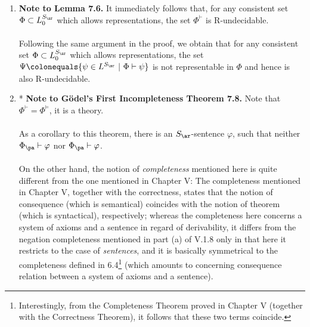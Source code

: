 \begin{enumerate}[1.]
\[\begin{cases}
\end{cases}
\]
This way we would obtain the same result.\\
\ \\
\textit{Remark.} The choice of $\beta (x)$ mentioned earlier somehow reminds me of Russel's paradox: For the set $S \colonequals \{ \mbox{\begin{math}x\end{math} is a set} \ | \ x \not\in x \}$, we have for all sets $x$,
\begin{center}
$x \in S$ \ \ \ iff \ \ \ $x \not\in x$.
\end{center}
In particular, for $x = S$,
\begin{center}
$S \in S$ \ \ \ iff \ \ \ $S \not\in S$.
\end{center}
[IMCOPLETE: Consider the relation between 7.5 and halting problem.]
%
\item \textbf{Note to Lemma 7.6.} It immediately follows that, for any consistent set $\Phi \subset L_0^{S_\ar}$ which allows representations, the set $\Phi^\vdash$ is R-undecidable.\\
\ \\
Following the same argument in the proof, we obtain that for any consistent set $\Phi \subset L_0^{S_\ar}$ which allows representations, the set $\Psi \colonequals \{ \psi \in L^{S_\ar} \ | \ \Phi \vdash \psi \}$ is not representable in $\Phi$ and hence is also R-undecidable.
%
\item* \textbf{Note to G\"{o}del's First Incompleteness Theorem 7.8.} Note that $\Phi^\vdash = \Phi^{\models}$, it is a theory.\\
\ \\
As a corollary to this theorem, there is an $S_\ar$-sentence $\varphi$, such that neither $\Phi_\pa \vdash \varphi$ nor $\Phi_\pa \vdash \varphi$.\\
\ \\
On the other hand, the notion of \emph{completeness} mentioned here is quite different from the one mentioned in Chapter V: The completeness mentioned in Chapter V, together with the correctness, states that the notion of consequence (which is semantical) coincides with the notion of theorem (which is syntactical), respectively; whereas the completeness here concerns a system of axioms and a sentence in regard of derivability, it differs from the negation completeness mentioned in part (a) of V.1.8 only in that here it restricts to the case of \emph{sentences}, and it is basically symmetrical to the completeness defined in 6.4\footnote{Interestingly, from the Completeness Theorem proved in Chapter V (together with the Correctness Theorem), it follows that these two terms coincide.} (which amounts to concerning consequence relation between a system of axioms and a sentence).\\

\end{enumerate}
